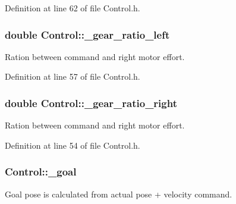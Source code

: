 Definition at line 62 of file Control.\-h.

\hypertarget{classControl_ad8c978657de600386fc66f935859e095}{
\subsubsection[{\-\_\-gear\-\_\-ratio\-\_\-left}]{\setlength{\rightskip}{0pt plus 5cm}double Control\-::\-\_\-gear\-\_\-ratio\-\_\-left\hspace{0.3cm}{\ttfamily [private]}}}\label{classControl_ad8c978657de600386fc66f935859e095}


Ration between command and right motor effort. 



Definition at line 57 of file Control.\-h.

\hypertarget{classControl_a78d7fb070693640585e703bb6f626cd1}{
\subsubsection[{\-\_\-gear\-\_\-ratio\-\_\-right}]{\setlength{\rightskip}{0pt plus 5cm}double Control\-::\-\_\-gear\-\_\-ratio\-\_\-right\hspace{0.3cm}{\ttfamily [private]}}}\label{classControl_a78d7fb070693640585e703bb6f626cd1}


Ration between command and right motor effort. 



Definition at line 54 of file Control.\-h.

\hypertarget{classControl_a55028ed5b7ee32c69282a3e51a7d63f1}{
\subsubsection[{\-\_\-goal}]{ Control\-::\-\_\-goal\hspace{0.3cm}{\ttfamily [private]}}}\label{classControl_a55028ed5b7ee32c69282a3e51a7d63f1}


Goal pose is calculated from actual pose + velocity command. 



